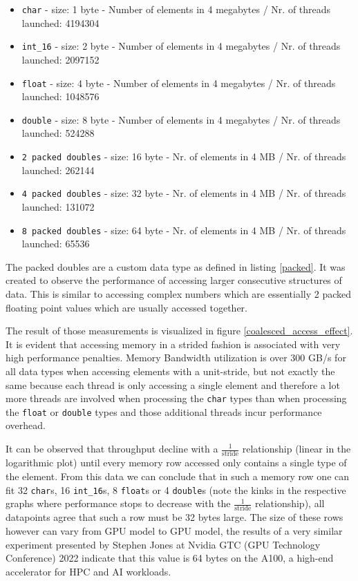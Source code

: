 \documentclass[english,11pt,a4paper,table]{article} %
\begin{document}
\begin{itemize}
	\item \texttt{char} - size: 1 byte - Number of elements in 4 megabytes / Nr. of threads launched: 4194304
	\item \texttt{int\_16} - size: 2 byte - Number of elements in 4 megabytes / Nr. of threads launched: 2097152
	\item \texttt{float} - size: 4 byte - Number of elements in 4 megabytes / Nr. of threads launched: 1048576
	\item \texttt{double} - size: 8 byte - Number of elements in 4 megabytes / Nr. of threads launched: 524288
	\item \texttt{2 packed doubles} - size: 16 byte - Nr. of elements in 4 MB / Nr. of threads launched: 262144
	\item \texttt{4 packed doubles} - size: 32 byte - Nr. of elements in 4 MB / Nr. of threads launched: 131072
	\item \texttt{8 packed doubles} - size: 64 byte - Nr. of elements in 4 MB / Nr. of threads launched: 65536
\end{itemize}

The packed doubles are a custom data type as defined in listing \ref{packed}.
It was created to observe the performance of accessing larger consecutive structures of data.
This is similar to accessing complex numbers which are essentially 2 packed floating point values which are usually accessed together.


The result of those measurements is visualized in figure \ref{coalesced_access_effect}.
It is evident that accessing memory in a strided fashion is associated with very high performance penalties.
Memory Bandwidth utilization is over 300 GB/s for all data types when accessing elements with a unit-stride, but not exactly the same because each thread is only accessing a single element and therefore a lot more threads are involved when processing the \texttt{char} types than when processing the \texttt{float} or \texttt{double} types and those additional threads incur performance overhead.

It can be observed that throughput decline with a $\frac{1}{\text{stride}}$ relationship (linear in the logarithmic plot) until every memory row accessed only contains a single type of the element.
From this data we can conclude that in such a memory row one can fit 32 \texttt{char}s, 16 \texttt{int\_16}s, 8 \texttt{float}s or 4 \texttt{double}s (note the kinks in the respective graphs where performance stops to decrease with the $\frac{1}{\text{stride}}$ relationship), all datapoints agree that such a row must be 32 bytes large.
The size of these rows however can vary from GPU model to GPU model, the results of a very similar experiment presented by Stephen Jones at Nvidia GTC (GPU Technology Conference) 2022 \cite{HowCUDAP46:online} indicate that this value is 64 bytes on the A100, a high-end accelerator for HPC and AI workloads.
\end{document}
